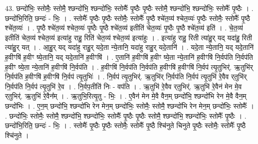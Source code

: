 \documentclass[17pt]{extarticle}
\begin{document}
43. छन्दो॑भिः॒ स्तोमैः॒ स्तोमै॒ श्छन्दो॑भि॒ श्छन्दो॑भिः॒ स्तोमैः᳚ पृ॒ष्ठैः पृ॒ष्ठैः स्तोमै॒ श्छन्दो॑भि॒ श्छन्दो॑भिः॒ स्तोमैः᳚ पृ॒ष्ठैः । . छन्दो॑भि॒रिति॒ छन्दः॑ - भिः॒ । . स्तोमैः᳚ पृ॒ष्ठैः पृ॒ष्ठैः स्तोमैः॒ स्तोमैः᳚ पृ॒ष्ठै श्चे॑त॒व्य॑ श्चेत॒व्यः॑ पृ॒ष्ठैः स्तोमैः॒ स्तोमैः᳚ पृ॒ष्ठै श्चे॑त॒व्यः॑ । . पृ॒ष्ठै श्चे॑त॒व्य॑ श्चेत॒व्यः॑ पृ॒ष्ठैः पृ॒ष्ठै श्चे॑त॒व्य॑ इतीति॑ चेत॒व्यः॑ पृ॒ष्ठैः पृ॒ष्ठै श्चे॑त॒व्य॑ इति॑ । . चे॒त॒व्य॑ इतीति॑ चेत॒व्य॑ श्चेत॒व्य॑ इत्या॑हु राहु॒ रिति॑ चेत॒व्य॑ श्चेत॒व्य॑ इत्या॑हुः । . इत्या॑हु राहु॒ रिती त्या॑हु॒र् यद् यदा॑हु॒ रिती त्या॑हु॒र् यत् । . आ॒हु॒र् यद् यदा॑हु राहु॒र् यदे॒ता न्ये॒तानि॒ यदा॑हु राहु॒र् यदे॒तानि॑ । . यदे॒ता न्ये॒तानि॒ यद् यदे॒तानि॑ ह॒वीꣳषि॑ ह॒वीꣳ ष्ये॒तानि॒ यद् यदे॒तानि॑ ह॒वीꣳषि॑ । . ए॒तानि॑ ह॒वीꣳषि॑ ह॒वीꣳ ष्ये॒ता न्ये॒तानि॑ ह॒वीꣳषि॑ नि॒र्वप॑ति नि॒र्वप॑ति ह॒वीꣳ ष्ये॒ता न्ये॒तानि॑ ह॒वीꣳषि॑ नि॒र्वप॑ति । . ह॒वीꣳषि॑ नि॒र्वप॑ति नि॒र्वप॑ति ह॒वीꣳषि॑ ह॒वीꣳषि॑ नि॒र्वप॑ त्यृ॒तुभिर्॑. ऋ॒तुभि॑र् नि॒र्वप॑ति ह॒वीꣳषि॑ ह॒वीꣳषि॑ नि॒र्वप॑ त्यृ॒तुभिः॑ । . नि॒र्वप॑ त्यृ॒तुभिर्॑. ऋ॒तुभि॑र् नि॒र्वप॑ति नि॒र्वप॑ त्यृ॒तुभि॑ रे॒वैव र्‌तुभि॑र् नि॒र्वप॑ति नि॒र्वप॑ त्यृ॒तुभि॑ रे॒व । . नि॒र्वप॒तीति॑ निः - वप॑ति । . ऋ॒तुभि॑ रे॒वैव र्‌तुभिर्॑. ऋ॒तुभि॑ रे॒वैन॑ मेन मे॒व र्‌तुभिर्॑. ऋ॒तुभि॑ रे॒वैन᳚म् । . ऋ॒तुभि॒रित्यृ॒तु - भिः॒ । . ए॒वैन॑ मेन मे॒वै वैन॒म् छन्दो॑भि॒ श्छन्दो॑भि रेन मे॒वै वैन॒म् छन्दो॑भिः । . ए॒न॒म् छन्दो॑भि॒ श्छन्दो॑भि रेन मेन॒म् छन्दो॑भिः॒ स्तोमैः॒ स्तोमै॒ श्छन्दो॑भि रेन मेन॒म् छन्दो॑भिः॒ स्तोमैः᳚ । . छन्दो॑भिः॒ स्तोमैः॒ स्तोमै॒ श्छन्दो॑भि॒ श्छन्दो॑भिः॒ स्तोमैः᳚ पृ॒ष्ठैः पृ॒ष्ठैः स्तोमै॒ श्छन्दो॑भि॒ श्छन्दो॑भिः॒ स्तोमैः᳚ पृ॒ष्ठैः । . छन्दो॑भि॒रिति॒ छन्दः॑ - भिः॒ । . स्तोमैः᳚ पृ॒ष्ठैः पृ॒ष्ठैः स्तोमैः॒ स्तोमैः᳚ पृ॒ष्ठै श्चि॑नुते चिनुते पृ॒ष्ठैः स्तोमैः॒ स्तोमैः᳚ पृ॒ष्ठै श्चि॑नुते । \newline
\end{document}
